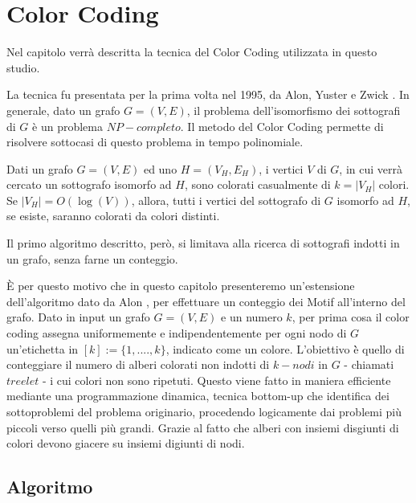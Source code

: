 \chapter{Color Coding}

Nel capitolo verr\`a descritta la tecnica del Color Coding utilizzata in questo studio.

La tecnica fu presentata per la prima volta nel 1995, da Alon, Yuster e Zwick \cite{alon1995color}.
In generale, dato un grafo $G = (V,E)$, il problema dell'isomorfismo dei sottografi  di $G$ \`e un problema $NP-completo$.
Il metodo del Color Coding permette di risolvere sottocasi di questo problema in tempo polinomiale.

Dati un grafo $ G = (V,E) $ ed uno $H = (V_H, E_H)$, i vertici $V$ di $G$, in cui verr\`a cercato un  sottografo isomorfo ad $H$, sono colorati casualmente di $k = |V_H|$ colori. Se $|V_H| = O(\log(V))$, allora, tutti i vertici del sottografo di $G$ isomorfo ad $H$, se esiste, saranno colorati da colori distinti.   

Il primo algoritmo descritto, per\`o, si limitava alla ricerca di sottografi indotti in un grafo, senza farne un conteggio.
 
\`E per questo motivo che in questo capitolo presenteremo un'estensione dell'algoritmo dato da Alon \cite{alon1995color}, per effettuare un conteggio dei Motif all'interno del grafo.
Dato in input un grafo $ G=(V,E) $ e un numero $ k $, per prima cosa il color coding assegna uniformemente e indipendentemente per ogni nodo di $ G $ un'etichetta in $ [k] := \{1,....,k\} $, indicato come un colore.
L'obiettivo \`è quello di conteggiare il numero di alberi colorati non indotti di $ k-nodi $ in $ G $ - chiamati $ treelet $ - i cui colori non sono ripetuti.
Questo viene fatto in maniera efficiente mediante una programmazione dinamica, tecnica bottom-up che identifica dei sottoproblemi del problema originario, procedendo logicamente dai problemi più piccoli verso quelli più grandi.
Grazie al fatto che alberi con insiemi disgiunti di colori devono giacere su insiemi digiunti di nodi.



\section{Algoritmo}

